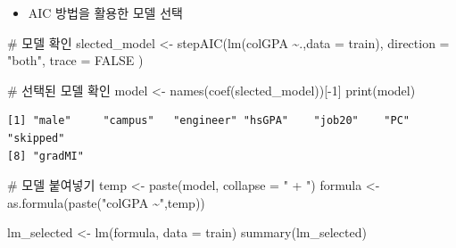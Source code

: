 \documentclass[
  letterpaper,
  DIV=11,
  numbers=noendperiod]{scrartcl}
\newenvironment{Shaded}{\begin{snugshade}}{\end{snugshade}}
\newcommand{\AttributeTok}[1]{\textcolor[rgb]{0.40,0.45,0.13}{#1}}
\newcommand{\CommentTok}[1]{\textcolor[rgb]{0.37,0.37,0.37}{#1}}
\newcommand{\ConstantTok}[1]{\textcolor[rgb]{0.56,0.35,0.01}{#1}}
\newcommand{\DecValTok}[1]{\textcolor[rgb]{0.68,0.00,0.00}{#1}}
\newcommand{\FunctionTok}[1]{\textcolor[rgb]{0.28,0.35,0.67}{#1}}
\newcommand{\NormalTok}[1]{\textcolor[rgb]{0.00,0.23,0.31}{#1}}
\newcommand{\OtherTok}[1]{\textcolor[rgb]{0.00,0.23,0.31}{#1}}
\newcommand{\SpecialCharTok}[1]{\textcolor[rgb]{0.37,0.37,0.37}{#1}}
\newcommand{\StringTok}[1]{\textcolor[rgb]{0.13,0.47,0.30}{#1}}
\providecommand{\tightlist}{%
  \setlength{\itemsep}{0pt}\setlength{\parskip}{0pt}}\usepackage{longtable,booktabs,array}
\begin{document}
\begin{itemize}
\tightlist
\item
  AIC 방법을 활용한 모델 선택
\end{itemize}

\begin{Shaded}
\begin{Highlighting}[]
\CommentTok{\# 모델 확인 }
\NormalTok{slected\_model }\OtherTok{\textless{}{-}}  \FunctionTok{stepAIC}\NormalTok{(}\FunctionTok{lm}\NormalTok{(colGPA }\SpecialCharTok{\textasciitilde{}}\NormalTok{.,}\AttributeTok{data =}\NormalTok{ train),}
                          \AttributeTok{direction =} \StringTok{"both"}\NormalTok{,}
                          \AttributeTok{trace =} \ConstantTok{FALSE}
\NormalTok{                          )}

\CommentTok{\# 선택된 모델 확인}
\NormalTok{model }\OtherTok{\textless{}{-}} \FunctionTok{names}\NormalTok{(}\FunctionTok{coef}\NormalTok{(slected\_model))[}\SpecialCharTok{{-}}\DecValTok{1}\NormalTok{]}
\FunctionTok{print}\NormalTok{(model)}
\end{Highlighting}
\end{Shaded}

\begin{verbatim}
[1] "male"     "campus"   "engineer" "hsGPA"    "job20"    "PC"       "skipped" 
[8] "gradMI"  
\end{verbatim}

\begin{Shaded}
\begin{Highlighting}[]
\CommentTok{\# 모델 붙여넣기 }
\NormalTok{temp }\OtherTok{\textless{}{-}} \FunctionTok{paste}\NormalTok{(model, }\AttributeTok{collapse =} \StringTok{" + "}\NormalTok{)}
\NormalTok{formula }\OtherTok{\textless{}{-}}\FunctionTok{as.formula}\NormalTok{(}\FunctionTok{paste}\NormalTok{(}\StringTok{"colGPA \textasciitilde{}"}\NormalTok{,temp))}

\NormalTok{lm\_selected }\OtherTok{\textless{}{-}} \FunctionTok{lm}\NormalTok{(formula, }\AttributeTok{data =}\NormalTok{ train)}
\FunctionTok{summary}\NormalTok{(lm\_selected)}
\end{Highlighting}
\end{Shaded}
\end{document}
